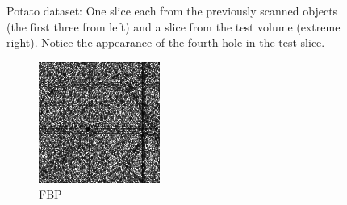 \documentclass[journal]{IEEEtran}
\begin{document}
\begin{figure}[!h]
\begin{subfigure}[b]{0.235\linewidth}
\captionsetup{labelformat=empty}
        \caption{}
\label{fig:potato_test}
     \end{subfigure}
      \caption{Potato dataset: One slice each from the previously scanned objects (the first three from left) and a slice from the test 
        volume (extreme right). Notice the appearance of the fourth
        hole in the test slice. }
\label{fig:object-prior_test_potato_A1}
\end{figure}
\begin{figure}[!h]
    \begin{subfigure}[b]{0.24\linewidth}
        \includegraphics[width=\textwidth]{../images/potato/post_tci/comparison/weightsIm_fbp30.png}
        \caption{FBP}
    \end{subfigure}
    \begin{subfigure}[b]{0.24\linewidth}

\end{subfigure}
\end{figure}
\end{document}
